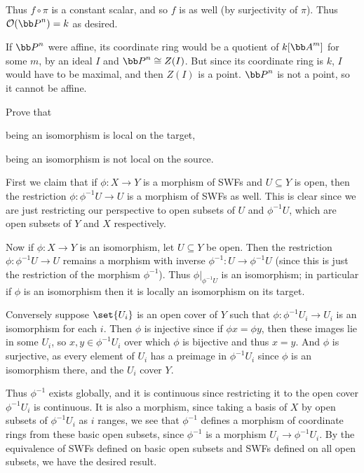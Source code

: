     Thus $f\circ\pi$ is a constant scalar, and so $f$ is as well (by surjectivity of $\pi$).
    Thus $\O(\bP^n)=k$ as desired.

    If $\bP^n$ were affine, its coordinate ring would be a quotient of $k[\bA^m]$ for some $m$, by an ideal $I$ and $\bP^n\cong Z(I)$.
    But since its coordinate ring is $k$, $I$ would have to be maximal, and then $Z(I)$ is a point.
    $\bP^n$ is not a point, so it cannot be affine.
\eenum

\bprob

    Prove that
    \benum
        \item being an isomorphism is local on the target,
        \item being an isomorphism is not local on the source.
    \eenum

\eprob

\benum
    \item First we claim that if $\phi\colon X\to Y$ is a morphism of SWFs and $U\subseteq Y$ is open, then the restriction
    $\phi\colon\phi^{-1}U\to U$ is a morphism of SWFs as well.
    This is clear since we are just restricting our perspective to open subsets of $U$ and $\phi^{-1}U$, which are open subsets of $Y$
    and $X$ respectively.

    Now if $\phi\colon X\to Y$ is an isomorphism, let $U\subseteq Y$ be open.
    Then the restriction $\phi\colon\phi^{-1}U\to U$ remains a morphism with inverse $\phi^{-1}\colon U\to\phi^{-1}U$ (since this is just
    the restriction of the morphism $\phi^{-1}$).
    Thus $\phi|_{\phi^{-1}U}$ is an isomorphism; in particular if $\phi$ is an isomorphism then it is locally an isomorphism on its target.

    Conversely suppose $\set{U_i}$ is an open cover of $Y$ such that $\phi\colon\phi^{-1}U_i\to U_i$ is an isomorphism for each $i$.
    Then $\phi$ is injective since if $\phi x=\phi y$, then these images lie in some $U_i$, so $x,y\in\phi^{-1}U_i$ over which $\phi$
    is bijective and thus $x=y$.
    And $\phi$ is surjective, as every element of $U_i$ has a preimage in $\phi^{-1}U_i$ since $\phi$ is an isomorphism there, and the
    $U_i$ cover $Y$.

    Thus $\phi^{-1}$ exists globally, and it is continuous since restricting it to the open cover $\phi^{-1}U_i$ is continuous.
    It is also a morphism, since taking a basis of $X$ by open subsets of $\phi^{-1}U_i$ as $i$ ranges, we see that $\phi^{-1}$ defines
    a morphism of coordinate rings from these basic open subsets, since $\phi^{-1}$ is a morphism $U_i\to\phi^{-1}U_i$.
    By the equivalence of SWFs defined on basic open subsets and SWFs defined on all open subsets, we have the desired result.

